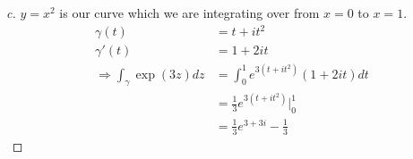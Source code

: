 \documentclass[a4paper, 11pt]{article}
\begin{document}
	\begin{proof}[c]
		$y=x^2$ is our curve which we are integrating over from $x=0$ to $x=1$. 
			\begin{align*}
				\gamma(t) &= t+it^2 \\ 
				\gamma'(t) &= 1+2it \\ 
				\Rightarrow \int_\gamma \exp(3z)dz &= \int_0^1 e^{3(t+it^2)}(1+2it)dt \\ 
					&= \frac{1}{3}e^{3(t+it^2)}\Big|_0^1 \\ 
					&= \frac{1}{3}e^{3+3i}-\frac{1}{3}  
			\end{align*}	
	\end{proof}
































































		
\end{document}
